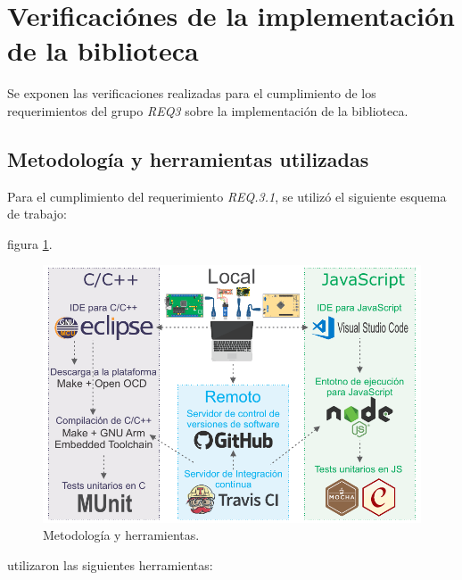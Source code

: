 \section{Verificaciónes de la implementación de la biblioteca}

Se exponen las verificaciones realizadas para el cumplimiento de los requerimientos del grupo \emph{REQ3} sobre la implementación de la biblioteca.

\subsection{Metodología y herramientas utilizadas}

Para el cumplimiento del requerimiento \emph{REQ.3.1}, se utilizó el  siguiente esquema de trabajo:

figura \ref{fig:ciTools}.

\begin{figure}[!htbp]
\begin{center}  %
\includegraphics*[width=14cm]{Figures/ciTools.pdf}
\par\caption{Metodología y herramientas.}\label{fig:ciTools}
\end{center}
\end{figure}




  utilizaron las siguientes herramientas:


